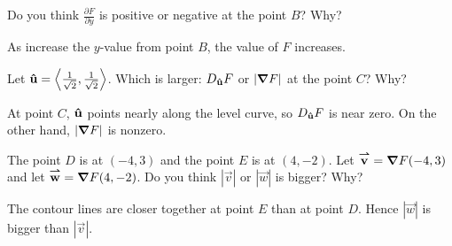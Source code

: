 \documentclass{ximera}
\begin{document}
\begin{problem}
  Do you think $\frac{\partial F}{\partial y}$ is positive or negative at the point $B$?  Why?
\begin{prompt}
  \begin{multipleChoice}
  \end{multipleChoice}
  \begin{feedback}
    As increase the $y$-value from point $B$, the value of $F$ increases.
  \end{feedback}
\end{prompt}

\vfill

\end{problem}

\begin{problem}
  Let $\mathbf{\hat{u}} = \left\langle  \frac{1}{\sqrt{2}}, \frac{1}{\sqrt{2}} \right\rangle$.  Which is larger: $D_{\mathbf{\hat{u}}} F$ or $|\boldsymbol\nabla F|$ at the point $C$?  Why?
  \begin{prompt}
    \begin{multipleChoice}
    \end{multipleChoice}
    \begin{feedback}
      At point $C$, $\mathbf{\hat{u}}$ points nearly along the level curve, so $D_{\mathbf{\hat{u}}} F$ is near zero. On the other hand, $|\boldsymbol\nabla F|$ is nonzero. 
    \end{feedback}
  \end{prompt}

\vfill
  
\end{problem}


\begin{problem}
The point $D$ is at $(-4,3)$ and the point $E$ is at $(4,-2)$. Let
${\overset{\boldsymbol{\rightharpoonup}}{\mathbf{v}}} = \boldsymbol\nabla F(-4,3)$ and let ${\overset{\boldsymbol{\rightharpoonup}}{\mathbf{w}}} = \boldsymbol\nabla F(4,-2)$.  Do you
think $|\vec{v}|$ or $|\vec{w}|$ is bigger?  Why?
\begin{prompt}
  \begin{multipleChoice}
  \end{multipleChoice}
  \begin{feedback}
    The contour lines are closer together at point $E$ than at point $D$. Hence $|\vec{w}|$ is bigger than $|\vec{v}|$.
  \end{feedback}
\end{prompt}

\vfill

\end{problem}
\end{document}
